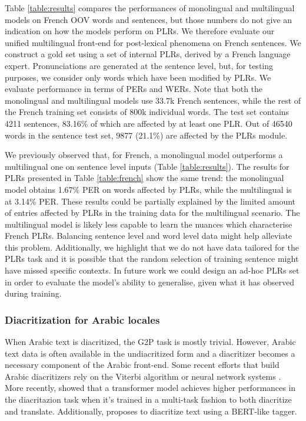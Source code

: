 Table \ref{table:results} compares the performances of monolingual and multilingual models on French OOV words and sentences, but those numbers do not give an indication on how the models perform on PLRs. 
We therefore evaluate our unified multilingual front-end for post-lexical phenomena on French sentences.
We construct a gold set using a set of internal PLRs, derived by a French language expert.
Pronunciations are generated at the sentence level, but, for testing purposes, we consider only words which have been modified by PLRs.
We evaluate performance in terms of PERs and WERs.
Note that both the monolingual and multilingual models use \mytextapprox33.7k French sentences, while the rest of the French training set consists of \mytextapprox800k individual words.
The test set contains 4211 sentences, 83.16\% of which are affected by at least one PLR.
Out of 46540 words in the sentence test set, 9877 (21.1\%) are affected by the PLRs module. 

We previously observed that, for French, a monolingual model outperforms a multilingual one on sentence level inputs (Table \ref{table:results}).
The results for PLRs presented in Table \ref{table:french} show the same trend: the monolingual model obtains 1.67\% PER on words affected by PLRs, while the multilingual is at 3.14\% PER.
These results could be partially explained by the limited amount of entries affected by PLRs in the training data for the multilingual scenario.
The multilingual model is likely less capable to learn the nuances which characterise French PLRs.
Balancing sentence level and word level data might help alleviate this problem.
Additionally, we highlight that we do not have data tailored for the PLRs task and it is possible that the random selection of training sentence might have missed specific contexts.
In future work we could design an ad-hoc PLRs set in order to evaluate the model's ability to generalise, given what it has observed during training.


\subsubsection{Diacritization for Arabic locales}
\label{subsubsec:arabic}
When Arabic text is diacritized, the G2P task is mostly trivial. However, Arabic text data is often available in the undiacritized form and a diacritizer becomes a necessary component of the Arabic front-end.
Some recent efforts that build Arabic diacritizers rely on the Viterbi algorithm \cite{Darwish17, hadjir19} or neural network systems \cite{dnn19, s2s19, s2s2_19}.
More recently, \cite{dia_and_translate21} showed that a transformer model \cite{vaswani17} achieves higher performances in the diacritazion task when it's trained in a multi-task fashion to both diacritize and translate.
Additionally, \cite{bert_diacritizer22} proposes to diacritize text using a BERT-like tagger.

